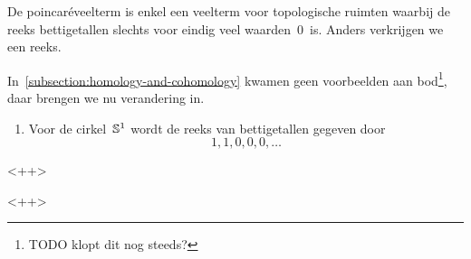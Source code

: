 \documentclass[a4paper,11pt,openany,oneside,article]{memoir}
\begin{document}
\begin{remark}
  De poincar\'eveelterm is enkel een veelterm voor topologische ruimten waarbij de reeks bettigetallen slechts voor eindig veel waarden~$0$~is. Anders verkrijgen we een reeks.
\end{remark}

In~\cref{subsection:homology-and-cohomology} kwamen geen voorbeelden aan bod\footnote{TODO klopt dit nog steeds?}, daar brengen we nu verandering in.
\begin{example}
  \begin{enumerate}
    \item Voor de cirkel~$\mathbb{S}^1$ wordt de reeks van bettigetallen gegeven door
      \begin{equation}
        1,1,0,0,0,\ldots
      \end{equation}

  \end{enumerate}<++>
\end{example}<++>




\nocite{*}


\end{document}
